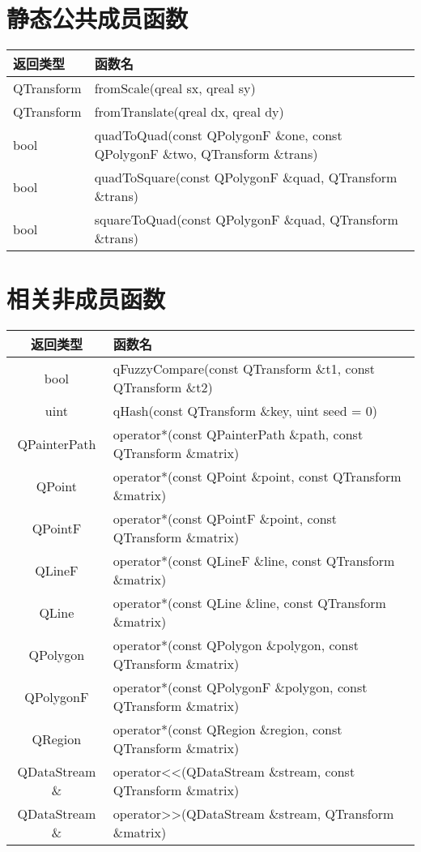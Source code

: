 \section{静态公共成员函数}

\begin{tabular}{|l|m{32em}|}
\hline
返回类型 &	函数名 \\ 
\hline
QTransform &	fromScale(qreal sx, qreal sy) \\ 
\hline
QTransform &	fromTranslate(qreal dx, qreal dy) \\
\hline
bool& 	quadToQuad(const QPolygonF \&one, const QPolygonF \&two, QTransform \&trans) \\ 
\hline 
bool 	&quadToSquare(const QPolygonF \&quad, QTransform \&trans) \\ 
\hline
bool &	squareToQuad(const QPolygonF \&quad, QTransform \&trans) \\ 
\hline
\end{tabular}

\section{相关非成员函数}

\begin{tabular}{|c|l|}
\hline
返回类型 &	函数名 \\ 
\hline
bool &	qFuzzyCompare(const QTransform \&t1, const QTransform \&t2) \\ 
\hline
uint &	qHash(const QTransform \&key, uint seed = 0) \\ 
\hline
QPainterPath &	operator*(const QPainterPath \&path, const QTransform \&matrix) \\ 
\hline
QPoint &	operator*(const QPoint \&point, const QTransform \&matrix) \\ 
\hline
QPointF &	operator*(const QPointF  \&point, const QTransform \&matrix) \\ 
\hline
QLineF 	&operator*(const QLineF \&line, const QTransform \&matrix) \\ 
\hline
QLine &	operator*(const QLine \&line, const QTransform \&matrix) \\ 
\hline
QPolygon &	operator*(const QPolygon \&polygon, const QTransform \&matrix) \\ 
\hline
QPolygonF &	operator*(const QPolygonF \&polygon, const QTransform \&matrix) \\ 
\hline
QRegion &	operator*(const QRegion \&region, const QTransform \&matrix) \\ 
\hline
QDataStream \& &	operator<<(QDataStream \&stream, const QTransform \&matrix) \\ 
\hline
QDataStream \& &	operator>>(QDataStream \&stream, QTransform \&matrix)\\
\hline
\end{tabular}


